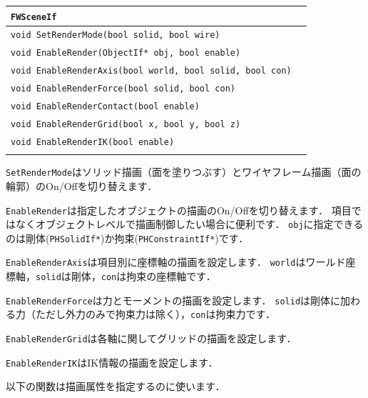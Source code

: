 \noindent
\begin{tabular}{p{.8\hsize}p{.1\hsize}}
\\
\texttt{FWSceneIf}													\\ \midrule
\texttt{void SetRenderMode(bool solid, bool wire)}					&	\\
\texttt{void EnableRender(ObjectIf* obj, bool enable)}				&	\\
\texttt{void EnableRenderAxis(bool world, bool solid, bool con)}	&	\\
\texttt{void EnableRenderForce(bool solid, bool con)}				&	\\
\texttt{void EnableRenderContact(bool enable)}						&	\\
\texttt{void EnableRenderGrid(bool x, bool y, bool z)}				&	\\
\texttt{void EnableRenderIK(bool enable)}							&	\\
\\
\end{tabular}

\texttt{SetRenderMode}はソリッド描画（面を塗りつぶす）とワイヤフレーム描画（面の輪郭）のOn/Offを切り替えます．

\texttt{EnableRender}は指定したオブジェクトの描画のOn/Offを切り替えます．
\KLUDGE 項目ではなくオブジェクトレベルで描画制御したい場合に便利です．
\texttt{obj}に指定できるのは剛体(\texttt{PHSolidIf*})か拘束(\texttt{PHConstraintIf*})です．

\texttt{EnableRenderAxis}は項目別に座標軸の描画を設定します．
\texttt{world}はワールド座標軸，\texttt{solid}は剛体，\texttt{con}は拘束の座標軸です．

\texttt{EnableRenderForce}は力とモーメントの描画を設定します．
\texttt{solid}は剛体に加わる力（ただし外力のみで拘束力は除く），\texttt{con}は拘束力です．

\texttt{EnableRenderGrid}は各軸に関してグリッドの描画を設定します．

\texttt{EnableRenderIK}はIK情報の描画を設定します．

\KLUDGE 以下の関数は描画属性を指定するのに使います．

